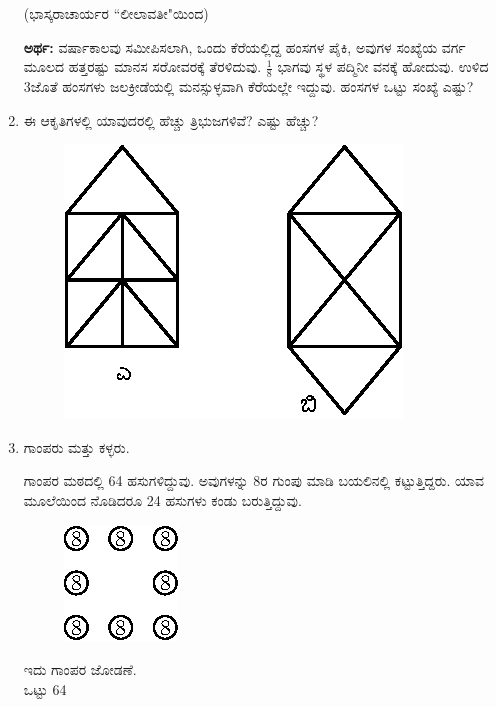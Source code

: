 \begin{enumerate}
\smallskip

\hfill (ಭಾಸ್ಕರಾಚಾರ್ಯರ ``ಲೀಲಾವತೀ"ಯಿಂದ)


{\bf ಅರ್ಥ:} ವರ್ಷಾಕಾಲವು ಸಮೀಪಿಸಲಾಗಿ, ಒಂದು ಕೆರೆಯಲ್ಲಿದ್ದ ಹಂಸಗಳ ಪೈಕಿ, ಅವುಗಳ ಸಂಖ್ಯೆಯ ವರ್ಗ ಮೂಲದ ಹತ್ತರಷ್ಟು ಮಾನಸ ಸರೋವರಕ್ಕೆ ತೆರಳಿದುವು. $\frac{1}{8}$ ಭಾಗವು ಸ್ಥಳ ಪದ್ಮಿನೀ ವನಕ್ಕೆ ಹೋದುವು. ಉಳಿದ 3ಜೊತೆ ಹಂಸಗಳು ಜಲಕ್ರೀಡೆಯಲ್ಲಿ ಮನಸ್ಸುಳ್ಳವಾಗಿ ಕೆರೆಯಲ್ಲೇ ಇದ್ದುವು. ಹಂಸಗಳ ಒಟ್ಟು ಸಂಖ್ಯೆ ಎಷ್ಟು? 

\item ಈ ಆಕೃತಿಗಳಲ್ಲಿ ಯಾವುದರಲ್ಲಿ ಹೆಚ್ಚು ತ್ರಿಭುಜಗಳಿವೆ? ಎಷ್ಟು ಹೆಚ್ಚು?
\begin{figure}[H]
\centering
\includegraphics[scale=1.3]{images/chap12/q27.eps}
\end{figure}

\item ಗಾಂಪರು ಮತ್ತು ಕಳ್ಳರು. 

ಗಾಂಪರ ಮಠದಲ್ಲಿ 64 ಹಸುಗಳಿದ್ದುವು. ಅವುಗಳನ್ನು 8ರ ಗುಂಪು ಮಾಡಿ ಬಯಲಿನಲ್ಲಿ ಕಟ್ಟುತ್ತಿದ್ದರು. ಯಾವ ಮೂಲೆಯಿಂದ ನೊಡಿದರೂ 24 ಹಸುಗಳು ಕಂಡು ಬರುತ್ತಿದ್ದುವು. 

\begin{minipage}[c]{4cm}
\begin{figure}[H]
\centering
\includegraphics{images/chap12/q28a.eps}
\end{figure}
\end{minipage}
\begin{minipage}[c]{5cm}
ಇದು ಗಾಂಪರ ಜೋಡಣೆ.\\
ಒಟ್ಟು 64
\end{minipage}

\smallskip


\end{enumerate}
